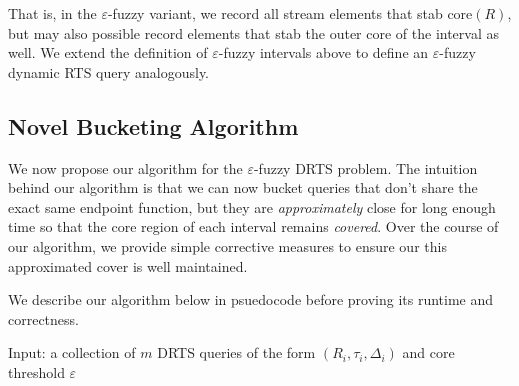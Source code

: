 That is, in the $\varepsilon$-fuzzy variant, we record all stream elements that stab $\text{core}(R)$, but may also possible record elements that stab the outer core of the interval as well. We  extend the definition of $\varepsilon$-fuzzy intervals above to define an $\varepsilon$-fuzzy dynamic RTS query analogously. 

\subsection{Novel Bucketing Algorithm}
\label{sec:novel-bucketing-algorithm}
We now propose our algorithm for the $\varepsilon$-fuzzy DRTS problem. The intuition behind our algorithm is that we can now bucket queries that don't share the exact same endpoint function, but they are \textit{approximately} close for long enough time so that the core region of each interval remains \textit{covered}. Over the course of our algorithm, we provide simple corrective measures to ensure our this approximated cover is well maintained. 

We describe our algorithm below in psuedocode before proving its runtime and correctness. 


Input: a collection of $m$ DRTS queries of the form $(R_i, \tau_i, \Delta_i)$ and core threshold $\varepsilon$

